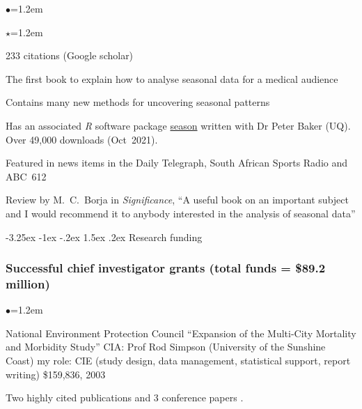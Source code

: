 \documentclass[a4paper,11pt]{article}
\makeatletter
\renewcommand\subsection{\@startsection{subsection}{2}{\z@}%
                                       {-3.25ex \@plus -1ex \@minus -.2ex}%
                                       {1.5ex \@plus .2ex}%
                                   {\normalfont\normalsize\bfseries\color{blue}}}
\renewcommand{\labelitemi}{$\bullet$}
\renewcommand{\labelitemii}{$\star$}
\makeatother
\begin{document}
\begin{raggedright}
\begin{list}{\labelitemi}{\leftmargin=1.2em}
\begin{list}{\labelitemii}{\leftmargin=1.2em}
\item 233 citations (Google scholar)
\item The first book to explain how to analyse seasonal data for a medical audience
\item Contains many new methods for uncovering seasonal patterns
\item Has an associated \textit{R} software package \href{http://cran.r-project.org/web/packages/season/index.html}{season} written with Dr Peter Baker (UQ). Over 49,000 downloads (Oct~2021).
\item Featured in news items in the Daily Telegraph, South African Sports Radio and ABC~612
\item Review by M.\ C.\ Borja in \textit{Significance}, ``A useful book on an important subject and I would recommend it to anybody interested in the analysis of seasonal data''
\end{list}
\end{list}

\subsection{Research funding}

\subsubsection*{Successful chief investigator grants (total funds = \$89.2 million)} %

\begin{list}{\labelitemi}{\leftmargin=1.2em}\addtolength{\itemsep}{-0.5\baselineskip}

\item National Environment Protection Council ``Expansion of the Multi-City Mortality and Morbidity Study'' CIA: Prof Rod Simpson (University of the Sunshine Coast) my role: CIE (study design, data management, statistical support, report writing) \$159,836, 2003

    Two highly cited publications  and 3 conference papers .


\end{list}
\end{raggedright}
\end{document}
